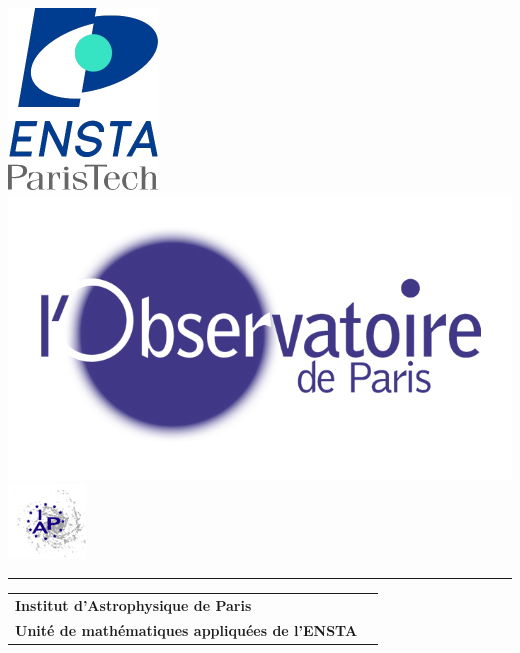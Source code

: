 \begin{titlepage}
	\thispagestyle{empty}
	\noindent
	\begin{minipage}{\linewidth}
		\includegraphics[scale=0.2]{./logo/logo_ENSTA.png} \hfill \includegraphics[scale=0.1]{./logo/logo-obspm.png} \hfill \includegraphics[scale=0.5]{./logo/logo-iap.png} \\
		{\rule{\linewidth}{1pt}}
		\begin{center}
			\begin{tabular}{p{13cm}r}
				\hspace{-2mm}\textbf{Institut d'Astrophysique de Paris} \\
				\hspace{-2mm}\textbf{Unité de mathématiques appliquées de l'ENSTA} \\
			\end{tabular}
		\end{center}
	\end{minipage}


\end{titlepage}
